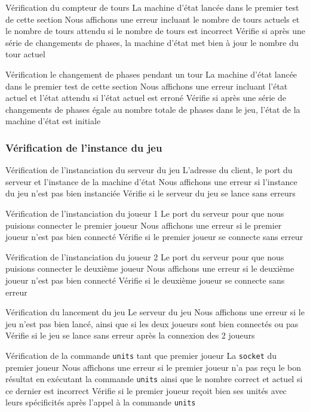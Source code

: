 \mytest
{Vérification du compteur de tours}
{La machine d'état lancée dans le premier test de cette section}
{Nous affichons une erreur incluant le nombre de tours actuels et le nombre de tours attendu si le nombre de tours est incorrect}
{Vérifie si après une série de changements de phases, la machine d'état met bien à jour le nombre du tour actuel}

\mytest
{Vérification le changement de phases pendant un tour}
{La machine d'état lancée dans le premier test de cette section}
{Nous affichons une erreur incluant l'état actuel et l'état attendu si l'état actuel est erroné}
{Vérifie si après une série de changements de phases égale au nombre totale de phases dans le jeu, l'état de la machine d'état est initiale}

\subsubsection{Vérification de l'instance du jeu}

\mytest
{Vérification de l'instanciation du serveur du jeu}
{L'adresse du client, le port du serveur et l'instance de la machine d'état}
{Nous affichons une erreur si l'instance du jeu n'est pas bien instanciée}
{Vérifie si le serveur du jeu se lance sans erreurs}

\mytest
{Vérification de l'instanciation du joueur 1}
{Le port du serveur pour que nous puisions connecter le premier joueur}
{Nous affichons une erreur si le premier joueur n'est pas bien connecté}
{Vérifie si le premier joueur se connecte sans erreur}

\mytest
{Vérification de l'instanciation du joueur 2}
{Le port du serveur pour que nous puisions connecter le deuxième joueur}
{Nous affichons une erreur si le deuxième joueur n'est pas bien connecté}
{Vérifie si le deuxième joueur se connecte sans erreur}

\mytest
{Vérification du lancement du jeu}
{Le serveur du jeu}
{Nous affichons une erreur si le jeu n'est pas bien lancé, ainsi que si les deux joueurs sont bien connectés ou pas}
{Vérifie si le jeu se lance sans erreur après la connexion des 2 joueurs}

\mytest
{Vérification de la commande {\tt units} tant que premier joueur}
{La {\tt socket} du premier joueur}
{Nous affichons une erreur si le premier joueur n'a pas reçu le bon résultat en exécutant la commande {\tt units} ainsi que le nombre correct et actuel si ce dernier est incorrect}
{Vérifie si le premier joueur reçoit bien ses unités avec leurs spécificités après l'appel à la commande {\tt units}}

